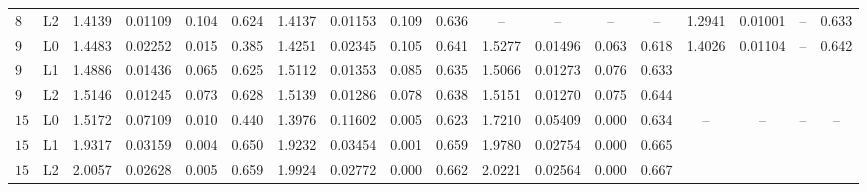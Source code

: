 \documentclass[10pt]{article}
\begin{document}
\begin{table}[H]
\begin{tabular}{ll cccc cccc cccc cccc}
    \addlinespace
    $8$ & L2 & 1.4139 & 0.01109 & 0.104 & 0.624 & 1.4137 & 0.01153 & 0.109 & 0.636 & -- & -- & -- & -- & 1.2941 & 0.01001 & -- & 0.633 \\
    \addlinespace
    $9$ & L0 & 1.4483 & 0.02252 & 0.015 & 0.385 & 1.4251 & 0.02345 & 0.105 & 0.641 & 1.5277 & 0.01496 & 0.063 & 0.618 & 1.4026 & 0.01104 & -- & 0.642 \\
    $9$ & L1 & 1.4886 & 0.01436 & 0.065 & 0.625 & 1.5112 & 0.01353 & 0.085 & 0.635 & 1.5066 & 0.01273 & 0.076 & 0.633 &  &  &  &  \\
    $9$ & L2 & 1.5146 & 0.01245 & 0.073 & 0.628 & 1.5139 & 0.01286 & 0.078 & 0.638 & 1.5151 & 0.01270 & 0.075 & 0.644 &  &  &  &  \\
    \addlinespace
    $15$ & L0 & 1.5172 & 0.07109 & 0.010 & 0.440 & 1.3976 & 0.11602 & 0.005 & 0.623 & 1.7210 & 0.05409 & 0.000 & 0.634 & -- & -- & -- & -- \\
    $15$ & L1 & 1.9317 & 0.03159 & 0.004 & 0.650 & 1.9232 & 0.03454 & 0.001 & 0.659 & 1.9780 & 0.02754 & 0.000 & 0.665 &  &  &  &  \\
    $15$ & L2 & 2.0057 & 0.02628 & 0.005 & 0.659 & 1.9924 & 0.02772 & 0.000 & 0.662 & 2.0221 & 0.02564 & 0.000 & 0.667 &  &  &  &  \\
    \bottomrule
  \end{tabular}
\end{table}
\end{document}
